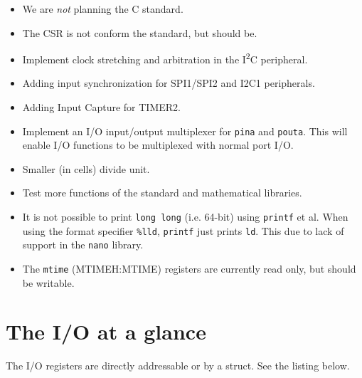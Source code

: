 \documentclass[12pt]{article}
\begin{document}
\begin{itemize}
\item We are \emph{not} planning the C standard.
\item The CSR is not conform the standard, but should be.
\item Implement clock stretching and arbitration in the I\textsuperscript{2}C peripheral.
\item Adding input synchronization for SPI1/SPI2 and I2C1 peripherals.
\item Adding Input Capture for TIMER2.
\item Implement an I/O input/output multiplexer for \lstinline|pina| and \lstinline|pouta|. This will enable I/O functions to be multiplexed with normal port I/O.
\item Smaller (in cells) divide unit.
\item Test more functions of the standard and mathematical libraries.
\item It is not possible to print \lstinline|long long| (i.e. 64-bit) using \lstinline|printf| et al. When using the format specifier \lstinline|%lld|, \lstinline|printf| just prints \lstinline|ld|. This due to lack of support in the \lstinline|nano| library.
\item The \lstinline|mtime| (MTIMEH:MTIME) registers are currently read only, but should be writable.
\end{itemize}

\appendix
\section{The I/O at a glance}

The I/O registers are directly addressable or by a struct. See the listing below.
\end{document}
